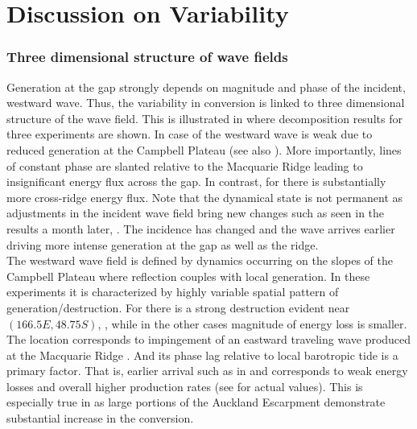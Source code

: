 \documentclass[12pt]{article}
\begin{document}
\section{Discussion on Variability}
\subsubsection{Three dimensional structure of wave fields}
Generation at the gap strongly depends on magnitude and phase of the incident, westward wave. 
Thus, the variability in conversion is linked to three dimensional structure of the wave field. 
This is illustrated in  where decomposition results for three 
experiments are shown. In case of  the westward wave is weak due to reduced generation at 
the Campbell Plateau (see also ). More importantly, lines of constant phase 
are slanted relative to the Macquarie Ridge leading to insignificant energy flux across the gap. In 
contrast, for  there is substantially more cross-ridge energy flux. Note that the 
dynamical state is not permanent as adjustments in the incident wave field bring new changes such 
as seen in the results a month later,  . The incidence 
has changed and the wave arrives earlier driving more intense generation at the gap as well as the 
ridge.\\

The westward wave field is defined by dynamics occurring on the slopes of the Campbell Plateau 
where reflection couples with local generation. In these experiments it is characterized by highly 
variable spatial pattern of generation/destruction. For  there is a strong destruction 
evident near $(166.5E, 48.75S)$, , while in the other cases 
magnitude 
of energy loss is smaller. The location corresponds to impingement of an eastward traveling wave 
produced at the Macquarie 
Ridge . And its phase lag relative to local barotropic tide 
is a primary factor. That is, earlier arrival such as in  and 
 corresponds to weak energy losses and overall higher production rates (see 
 for actual values). This is especially true in  as large 
portions of the Auckland Escarpment demonstrate substantial increase in the conversion.\\
\end{document}
